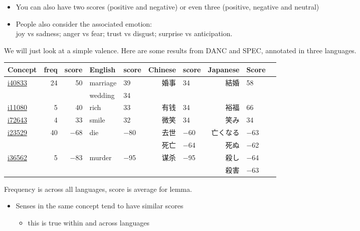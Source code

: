 \documentclass[a4paper,landscape,headrule,footrule,xetex]{foils}
\newcommand{\ili}[1]{\href{http://www.globalwordnet.org/ili/#1}{\url{#1}}}
\begin{document}
\begin{itemize}
\item You can also have two scores (positive and negative) or even
  three (positive, negative and neutral)
\item People also consider the associated emotion: \citep{Plutchik:1980}
\\  joy vs sadness; anger vs fear; trust vs disgust;  surprise vs anticipation. 
\end{itemize}
    


We will just look at a simple valence.  Here are some results from
DANC and SPEC, annotated in three languages.


  \begin{small}
    \begin{tabular}{lrrllrlrlr}
      Concept & freq & score & English & score & Chinese & score & Japanese & Score \\
      \hline
      \ili{i40833}  &   24 &  50 & marriage & 39 & 婚事 & 34 & 結婚	& 58\\
      &      &  & wedding  & 34 \\   
      \ili{i11080}  & 5& 40  &  rich & 33 & 有钱 & 34 &  裕福 & 66  \\
      \ili{i72643} & 4 & 33 &  smile &   32 & 微笑	& 34 & 笑み & 34 \\
      \ili{i23529}  & 40 & $-$68  & die & $-$80 &  去世 & $-$60 &亡くなる & $-63$ \\
      &        &  &  &       & 死亡  & $-$64 & 死ぬ & $-$62\\
      \ili{i36562}  & 5  & $-$83 & murder &$-$95  & 谋杀 & $-$95	 & 殺し & 	$-$64 \\
      &     &      && & & & 殺害 & $-$63 \\
    \end{tabular}
  \end{small}

Frequency is across all languages, score is average for lemma.

\begin{itemize}
\item Senses in the same concept tend to have similar scores
  \begin{itemize}
  \item this is true within and across languages
  \end{itemize}
\end{itemize}
\end{document}
